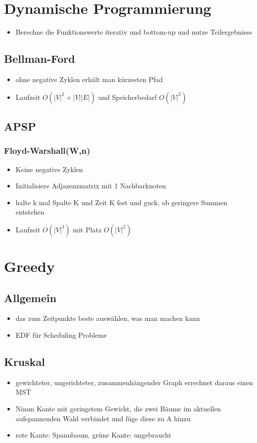 \documentclass{article}
\begin{document}
\section{Dynamische Programmierung}
\begin{itemize}
\item Berechne die Funktionswerte iterativ und bottom-up und nutze Teilergebnisse
\end{itemize}
\subsection{Bellman-Ford}
\begin{itemize}
\item ohne negative Zyklen erhält man kürzesten Pfad
\item  Laufzeit $O(|V|^2+|V||E|)$ und Speicherbedarf $O(|V|^2)$
\end{itemize}
\subsection{APSP}
\subsubsection{Floyd-Warshall(W,n)}
\begin{itemize}
\item Keine negative Zyklen
\item Initialisiere Adjazenzmatrix mit 1 Nachbarknoten
\item halte k mal Spalte K und Zeit K fest und guck, ob geringere Summen entstehen
\item Laufzeit $O(|V|^3)$ mit Platz $O(|V|^2)$
\end{itemize}



\section{Greedy}
\subsection{Allgemein}
\begin{itemize}
\item das zum Zeitpunkte beste auswählen, was man machen kann
\item EDF für Scheduling Probleme
\end{itemize}
 
\subsection{Kruskal}
\begin{itemize}
\item gewichteter, ungerichteter, zusammenhängender Graph errechnet daraus einen MST
\item Nimm Kante mit geringstem Gewicht, die zwei Bäume im aktuellen aufspannenden Wald verbindet und füge diese zu A hinzu
\item rote Kante: Spannbaum, grüne Kante: ungebraucht
\end{itemize}
\end{document}
